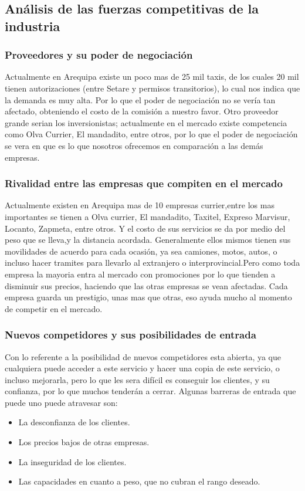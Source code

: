 \subsection{Análisis de las fuerzas competitivas de la industria}

\subsubsection{Proveedores y su poder de negociación}
Actualmente en Arequipa existe un poco mas de 25 mil taxis, de los cuales 20 mil tienen autorizaciones (entre Setare y permisos transitorios), lo cual nos indica que la demanda es muy alta. Por lo que el poder de negociación  no se vería tan afectado, obteniendo el costo de la comisión a nuestro favor. 
Otro proveedor grande serian los inversionistas; actualmente en el mercado existe competencia como Olva Currier, El mandadito, entre otros, por lo que el poder de negociación se vera en que es lo que nosotros ofrecemos en comparación a las demás empresas.

\subsubsection{Rivalidad entre las empresas que compiten en el mercado}
Actualmente existen en Arequipa mas de 10 empresas currier,entre los mas importantes se tienen a Olva currier, El mandadito, Taxitel, Expreso Marvisur, Locanto, Zapmeta, entre otros. Y el costo de sus servicios se da por medio del peso que se lleva,y la distancia acordada. Generalmente ellos mismos tienen sus movilidades de acuerdo para cada ocasión, ya sea camiones, motos, autos, o incluso hacer tramites para llevarlo al extranjero o interprovincial.Pero como toda empresa la mayoria entra al mercado con promociones por lo que tienden a disminuir sus precios, haciendo que las otras empresas se vean afectadas. 
Cada empresa guarda un prestigio, unas mas que otras, eso ayuda mucho al momento de competir en el mercado.

\subsubsection{Nuevos competidores y sus posibilidades de entrada}
Con lo referente a la posibilidad de nuevos competidores esta abierta, ya que cualquiera puede acceder a este servicio y hacer una copia de este servicio, o incluso mejorarla, pero lo que les sera difícil es conseguir los clientes, y su confianza, por lo que muchos tenderán a cerrar.
Algunas barreras de entrada que puede uno puede atravesar son:
\begin{itemize}
    \item La desconfianza de los clientes.
    \item Los precios bajos de otras empresas.
    \item La inseguridad de los clientes.
    \item Las capacidades en cuanto a peso, que no cubran el rango deseado. 
\end{itemize}

